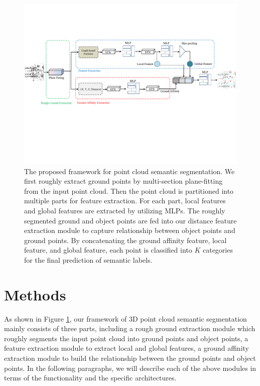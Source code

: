 \documentclass{sip}%
\begin{document}
\begin{figure}[ht]
	\begin{center}
		\includegraphics[width=1.0\linewidth]{framework.pdf} 
	\end{center}
	\caption{The proposed framework for point cloud semantic segmentation. We first roughly extract ground points by multi-section plane-fitting from the input point cloud. Then the point cloud is partitioned into multiple parts for feature extraction. For each part, local features and global features are extracted by utilizing MLPs. The roughly segmented ground and object points are fed into our distance feature extraction module to capture relationship between object points and ground points. By concatenating the ground affinity feature, local feature, and global feature, each point is classified into $K$ categories for the final prediction of semantic labels. }
	\label{fig:semi-global}
\end{figure}
\section{Methods}
As shown in Figure \ref{fig:semi-global}, our framework of 3D point cloud semantic segmentation mainly consists of three parts, including a rough ground extraction module which roughly segments the input point
cloud into ground points and object points, a feature extraction module to extract local and global features, a ground affinity extraction module to build the relationship between the ground points and object points.
In the following paragraphs, we will describe each of the above
modules in terms of the functionality and the specific architectures.
\end{document}
